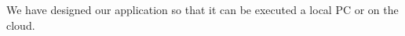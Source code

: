 \documentclass[sigconf,nonacm,11pt]{acmart}
\begin{document}
We have designed our application so that it can be executed a local PC or on the cloud.  








\end{document}
